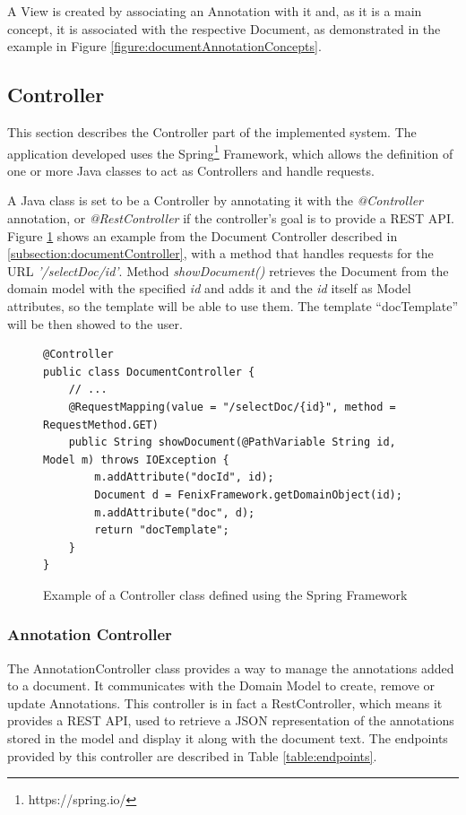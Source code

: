 \documentclass{llncs}
\begin{document}
A View is created by associating an Annotation with it and, as it is a main concept, it is associated with the respective Document, as demonstrated in the example in Figure \ref{figure:documentAnnotationConcepts}.

\subsection{Controller}

This section describes the Controller part of the implemented system. The application developed uses the Spring\footnote{https://spring.io/} Framework, which allows the definition of one or more Java classes to act as Controllers and handle requests.

A Java class is set to be a Controller by annotating it with the \textit{@Controller} annotation, or \textit{@RestController} if the controller's goal is to provide a REST API. Figure \ref{figure:springController} shows an example from the Document Controller described in \ref{subsection:documentController}, with a method that handles requests for the URL \textit{'/selectDoc/{id}'}. Method \textit{showDocument()} retrieves the Document from the domain model with the specified \textit{id} and adds it and the \textit{id} itself as Model attributes, so the template will be able to use them. The template ``docTemplate'' will be then showed to the user.

\begin{figure}
\lstset{style=customjava}
\begin{lstlisting}
@Controller
public class DocumentController {
	// ...
	@RequestMapping(value = "/selectDoc/{id}", method = RequestMethod.GET)
	public String showDocument(@PathVariable String id, Model m) throws IOException {
		m.addAttribute("docId", id);
		Document d = FenixFramework.getDomainObject(id);
		m.addAttribute("doc", d);
		return "docTemplate";
	}
}	
\end{lstlisting}
\caption{Example of a Controller class defined using the Spring Framework} 
\label{figure:springController}
\end{figure}

\subsubsection{Annotation Controller}
The AnnotationController class provides a way to manage the annotations added to a document. It communicates with the Domain Model to create, remove or update Annotations. This controller is in fact a RestController, which means it provides a REST API, used to retrieve a JSON representation of the annotations stored in the model and display it along with the document text. 
The endpoints provided by this controller are described in Table \ref{table:endpoints}.
	
\end{document}
